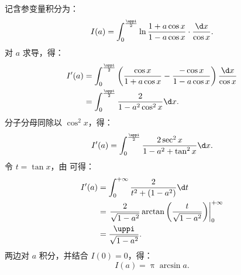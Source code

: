 \begin{solution}
    记含参变量积分为：
    \begin{equation}
        I(a) = \int_0^{\frac{\uppi}{2}} \ln \frac{1 + a \cos x}{1 - a \cos x} \cdot \frac{\d x}{\cos x}.
    \end{equation}
    对 $a$ 求导，得：
    \begin{equation}
        \begin{aligned}
            I'(a) & = \int_0^{\frac{\uppi}{2}} \left( \frac{\cos x}{1 + a \cos x} - \frac{-\cos x}{1 - a \cos x} \right) \frac{\d x}{\cos x} \\
                  & = \int_0^{\frac{\uppi}{2}} \frac{2}{1 - a^2 \cos^2 x} \d x.
        \end{aligned}
    \end{equation}
    分子分母同除以 $\cos^2 x$，得：
    \begin{equation}\label{eq:int4-deriv}
        I'(a) = \int_0^{\frac{\uppi}{2}} \frac{2\sec^2 x}{1 - a^2 + \tan^2 x} \d x.
    \end{equation}
    令 $t = \tan x$，由  可得：
    \begin{equation}
        \begin{aligned}
            I'(a) & = \int_0^{+\infty} \frac{2}{t^2 + (1 - a^2)} \d t                                                     \\
                  & = \left. \frac{2}{\sqrt{1 - a^2}} \arctan \left( \frac{t}{\sqrt{1 - a^2}} \right) \right|_0^{+\infty} \\
                  & = \frac{\uppi}{\sqrt{1 - a^2}}.
        \end{aligned}
    \end{equation}
    两边对 $a$ 积分，并结合 $I(0) = 0$，得：
    \begin{equation}
        \boxed{I(a) = \uppi \arcsin a}.
    \end{equation}
\end{solution}

\endinput

